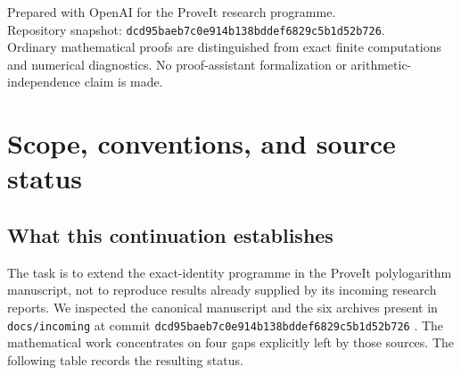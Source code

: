 \documentclass[11pt,a4paper]{article}
\numberwithin{equation}{section}
\theoremstyle{definition}
\theoremstyle{remark}
\newcommand{\src}[1]{\nolinkurl{#1}}
\begin{document}
\begin{titlepage}
\begin{minipage}{0.88\textwidth}
\end{minipage}
\vfill
\begin{minipage}{0.88\textwidth}\small
Prepared with OpenAI for the ProveIt research programme.\\[4pt]
Repository snapshot:
\src{dcd95baeb7c0e914b138bddef6829c5b1d52b726}.\\[4pt]
Ordinary mathematical proofs are distinguished from exact finite
computations and numerical diagnostics. No proof-assistant
formalization or arithmetic-independence claim is made.
\end{minipage}
\end{titlepage}
\hypersetup{pageanchor=true}
\tableofcontents
\clearpage
{}
\section{Scope, conventions, and source status}
\label{scope:sec}

\subsection{What this continuation establishes}

The task is to extend the exact-identity programme in the ProveIt
polylogarithm manuscript, not to reproduce results already supplied
by its incoming research reports. We inspected the canonical
manuscript and the six archives present in \src{docs/incoming}
at commit \src{dcd95baeb7c0e914b138bddef6829c5b1d52b726}
\cite{RepoMain,RepoEndpoint,RepoDougall,RepoTransport,RepoExact,
RepoCoincident,RepoTwisted}.
The mathematical work concentrates on four gaps explicitly left
by those sources. The following table records the resulting status.
\end{document}

